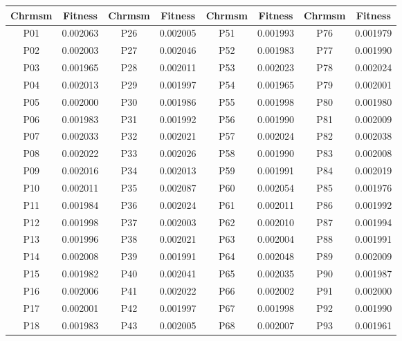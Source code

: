     \begin{table}[h]
        \centering
        \begin{tabular}{|cc|cc|cc|cc|}
            \hline
            \textbf{Chrmsm} & \textbf{Fitness} & \textbf{Chrmsm} & \textbf{Fitness} & \textbf{Chrmsm} & \textbf{Fitness} & \textbf{Chrmsm} & \textbf{Fitness} \\ \hline
            P01 & 0.002063 & P26 & 0.002005 & P51 & 0.001993 & P76 & 0.001979 \\ \hline
            P02 & 0.002003 & P27 & 0.002046 & P52 & 0.001983 & P77 & 0.001990 \\ \hline
            P03 & 0.001965 & P28 & 0.002011 & P53 & 0.002023 & P78 & 0.002024 \\ \hline
            P04 & 0.002013 & P29 & 0.001997 & P54 & 0.001965 & P79 & 0.002001 \\ \hline
            P05 & 0.002000 & P30 & 0.001986 & P55 & 0.001998 & P80 & 0.001980 \\ \hline
            P06 & 0.001983 & P31 & 0.001992 & P56 & 0.001990 & P81 & 0.002009 \\ \hline
            P07 & 0.002033 & P32 & 0.002021 & P57 & 0.002024 & P82 & 0.002038 \\ \hline
            P08 & 0.002022 & P33 & 0.002026 & P58 & 0.001990 & P83 & 0.002008 \\ \hline
            P09 & 0.002016 & P34 & 0.002013 & P59 & 0.001991 & P84 & 0.002019 \\ \hline
            P10 & 0.002011 & P35 & 0.002087 & P60 & 0.002054 & P85 & 0.001976 \\ \hline
            P11 & 0.001984 & P36 & 0.002024 & P61 & 0.002011 & P86 & 0.001992 \\ \hline
            P12 & 0.001998 & P37 & 0.002003 & P62 & 0.002010 & P87 & 0.001994 \\ \hline
            P13 & 0.001996 & P38 & 0.002021 & P63 & 0.002004 & P88 & 0.001991 \\ \hline
            P14 & 0.002008 & P39 & 0.001991 & P64 & 0.002048 & P89 & 0.002009 \\ \hline
            P15 & 0.001982 & P40 & 0.002041 & P65 & 0.002035 & P90 & 0.001987 \\ \hline
            P16 & 0.002006 & P41 & 0.002022 & P66 & 0.002002 & P91 & 0.002000 \\ \hline
            P17 & 0.002001 & P42 & 0.001997 & P67 & 0.001998 & P92 & 0.001990 \\ \hline
            P18 & 0.001983 & P43 & 0.002005 & P68 & 0.002007 & P93 & 0.001961 \\ \hline

\end{tabular}
\end{table}
